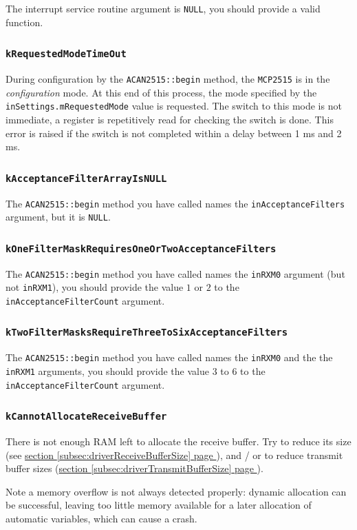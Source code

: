 \documentclass[10pt, a4paper, obeyspaces]{extarticle}
\newcommand\refSubsectionPage[1]{\hyperref[subsec:#1]{section \ref*{subsec:#1} page \pageref{subsec:#1}}}
\newcommand \subsubsectionLabel[2]{\subsubsection{#1}\label{subsubsec:#2}}
\begin{document}
The interrupt service routine argument is \texttt{NULL}, you should provide a valid function.


\subsubsectionLabel{\texttt{kRequestedModeTimeOut}}{kRequestedModeTimeOut}

During configuration by the \texttt{ACAN2515::begin} method, the  \texttt{MCP2515} is in the \emph{configuration} mode. At this end of this process, the mode specified by the \texttt{inSettings.mRequestedMode} value is requested. The switch to this mode is not immediate, a register is repetitively read for checking the switch is done. This error is raised if the switch is not completed within a delay between 1 ms and 2 ms.






\subsubsectionLabel{\texttt{kAcceptanceFilterArrayIsNULL}}{kAcceptanceFilterArrayIsNULL}

The \texttt{ACAN2515::begin} method you have called names the \texttt{inAcceptanceFilters} argument, but it is \texttt{NULL}.






\subsubsectionLabel{\texttt{kOneFilterMaskRequiresOneOrTwoAcceptanceFilters}}{kOneFilterMaskRequiresOneOrTwoAcceptanceFilters}

The \texttt{ACAN2515::begin} method you have called names the \texttt{inRXM0} argument (but not \texttt{inRXM1}), you should provide the value $1$ or $2$ to the \texttt{inAcceptanceFilterCount} argument.







\subsubsectionLabel{\texttt{kTwoFilterMasksRequireThreeToSixAcceptanceFilters}}{kTwoFilterMasksRequireThreeToSixAcceptanceFilters}

The \texttt{ACAN2515::begin} method you have called names the \texttt{inRXM0} and the the \texttt{inRXM1} arguments, you should provide the value $3$ to $6$ to the \texttt{inAcceptanceFilterCount} argument.



\subsubsectionLabel{\texttt{kCannotAllocateReceiveBuffer}}{kCannotAllocateReceiveBuffer}

There is not enough RAM left to allocate the receive buffer. Try to reduce its size (see \refSubsectionPage{driverReceiveBufferSize}), and / or to reduce transmit buffer sizes (\refSubsectionPage{driverTransmitBufferSize}).

Note a memory overflow is not always detected properly: dynamic allocation can be successful, leaving too little memory available for a later allocation of automatic variables, which can cause a crash.
\end{document}
